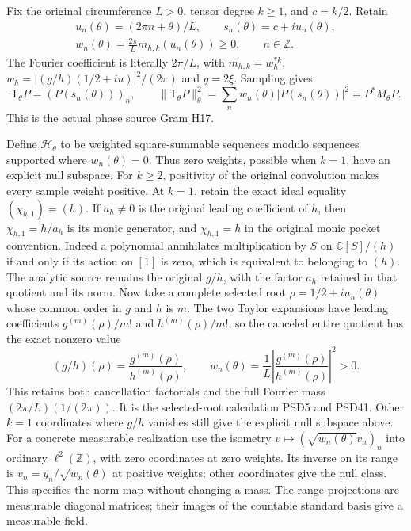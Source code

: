 \documentclass[11pt]{article}
\newcommand{\C}{\mathbb C}
\begin{document}
Fix the original circumference $L>0$, tensor degree $k\ge1$,
and $c=k/2$. Retain
\[
 \begin{gathered}
 u_n(\theta)=(2\pi n+\theta)/L,\qquad
 s_n(\theta)=c+iu_n(\theta),\\
 w_n(\theta)=\frac{2\pi}{L}m_{h,k}(u_n(\theta))\ge0,
 \qquad n\in\mathbb Z.
 \end{gathered}
 \tag{HCD17}
\]
The Fourier coefficient is literally $2\pi/L$, with
$m_{h,k}=w_h^{*k}$, $w_h=|(g/h)(1/2+iu)|^2/(2\pi)$
and $g=2\xi$. Sampling gives
\[
 \mathsf T_\theta P=(P(s_n(\theta)))_n,\qquad
 \|\mathsf T_\theta P\|_\theta^2
 =\sum_n w_n(\theta)|P(s_n(\theta))|^2=P^*M_\theta P.
 \tag{HCD18}
\]
This is the actual phase source Gram H17.

Define $\mathcal H_\theta$ to be weighted square-summable
sequences modulo sequences supported where $w_n(\theta)=0$.
Thus zero weights, possible when $k=1$, have an explicit
null subspace. For $k\ge2$, positivity of the original
convolution makes every sample weight positive.
At $k=1$, retain the exact ideal equality
$(\chi_{h,1})=(h)$. If $a_h\ne0$ is the original leading
coefficient of $h$, then $\chi_{h,1}=h/a_h$ is its monic
generator, and $\chi_{h,1}=h$ in the original monic packet
convention. Indeed a polynomial annihilates multiplication by
$S$ on $\C[S]/(h)$ if and only if its action on $[1]$ is
zero, which is equivalent to belonging to $(h)$.
The analytic source remains the original $g/h$, with
the factor $a_h$ retained in that quotient and its norm.
Now take a complete selected root
$\rho=1/2+iu_n(\theta)$ whose common order in $g$ and $h$
is $m$. The two Taylor expansions have leading coefficients
$g^{(m)}(\rho)/m!$ and $h^{(m)}(\rho)/m!$, so the canceled
entire quotient has the exact nonzero value
\[
 (g/h)(\rho)=\frac{g^{(m)}(\rho)}{h^{(m)}(\rho)},\qquad
 w_n(\theta)=\frac1L
 \left|\frac{g^{(m)}(\rho)}{h^{(m)}(\rho)}\right|^2>0.
 \tag{HCD18a}
\]
This retains both cancellation factorials and the full
Fourier mass $(2\pi/L)(1/(2\pi))$. It is the selected-root
calculation PSD5 and PSD41. Other $k=1$ coordinates where
$g/h$ vanishes still give the explicit null subspace above.
For a concrete measurable realization use the isometry
$v\mapsto(\sqrt{w_n(\theta)}v_n)_n$ into ordinary
$\ell^2(\mathbb Z)$, with zero coordinates at zero weights.
Its inverse on its range is
$v_n=y_n/\sqrt{w_n(\theta)}$ at positive weights; other
coordinates give the null class. This specifies the norm
map without changing a mass. The range projections are
measurable diagonal matrices; their images of the countable
standard basis give a measurable field.
\end{document}
